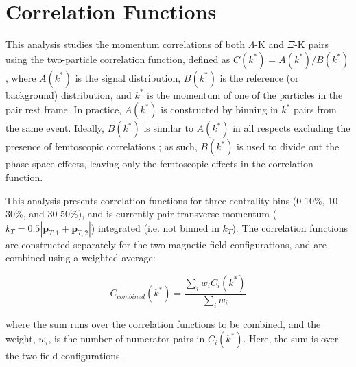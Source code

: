 \documentclass[../AnalysisNoteJBuxton.tex]{subfiles}
\begin{document}
\section{Correlation Functions}
\label{CorrelationFunctions}


This analysis studies the momentum correlations of both $\Lambda$-K and $\Xi$-K pairs using the two-particle correlation function, defined as $C(k^{*}) = A(k^{*})/B(k^{*})$, where $A(k^{*})$ is the signal distribution, $B(k^{*})$ is the reference (or background) distribution, and $k^{*}$ is the momentum of one of the particles in the pair rest frame.
In practice, $A(k^{*})$ is constructed by binning in $k^{*}$ pairs from the same event.
Ideally, $B(k^{*})$ is similar to $A(k^{*})$ in all respects excluding the presence of femtoscopic correlations \cite{Lisa:2005dd}; as such, $B(k^{*})$ is used to divide out the phase-space effects, leaving only the femtoscopic effects in the correlation function. 

This analysis presents correlation functions for three centrality bins (0-10\%, 10-30\%, and 30-50\%), and is currently pair transverse momentum ($k_{T} = 0.5|\mathbf{p}_{T,1}+\mathbf{p}_{T,2}|$) integrated (i.e. not binned in $k_{T}$).  
The correlation functions are constructed separately for the two magnetic field configurations, and are combined using a weighted average:

\begin{equation}
  C_{combined}(k^{*}) = \frac{\sum\limits_{i}w_{i}C_{i}(k^{*})}{\sum\limits_{i}w_{i}} 
\label{eqn:CombineCfs}
\end{equation}

where the sum runs over the correlation functions to be combined, and the weight, $w_{i}$, is the number of numerator pairs in $C_{i}(k^{*})$.
Here, the sum is over the two field configurations.




\clearpage
\end{document}

